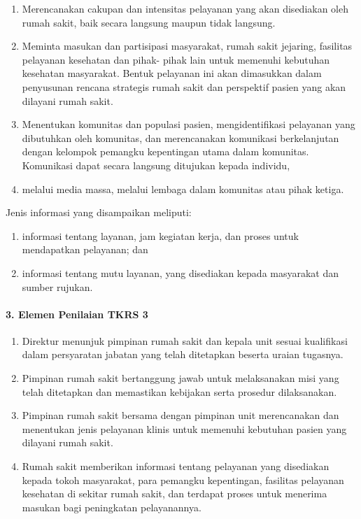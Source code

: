 \documentclass[
]{book}
\providecommand{\tightlist}{%
  \setlength{\itemsep}{0pt}\setlength{\parskip}{0pt}}
\begin{document}
\begin{enumerate}
\def\labelenumi{\alph{enumi}.}
\tightlist
\item
  Merencanakan cakupan dan intensitas pelayanan yang akan disediakan oleh rumah sakit, baik secara langsung maupun tidak langsung.
\item
  Meminta masukan dan partisipasi masyarakat, rumah sakit jejaring, fasilitas pelayanan kesehatan dan pihak- pihak lain untuk memenuhi kebutuhan kesehatan masyarakat. Bentuk pelayanan ini akan dimasukkan dalam penyusunan rencana strategis rumah sakit dan perspektif pasien yang akan dilayani rumah sakit.
\item
  Menentukan komunitas dan populasi pasien, mengidentifikasi pelayanan yang dibutuhkan oleh komunitas, dan merencanakan komunikasi berkelanjutan dengan kelompok pemangku kepentingan utama dalam komunitas. Komunikasi dapat secara langsung ditujukan kepada individu,
\item
  melalui media massa, melalui lembaga dalam komunitas atau pihak ketiga.
\end{enumerate}

Jenis informasi yang disampaikan meliputi:

\begin{enumerate}
\def\labelenumi{\alph{enumi}.}
\tightlist
\item
  informasi tentang layanan, jam kegiatan kerja, dan proses untuk mendapatkan pelayanan; dan
\item
  informasi tentang mutu layanan, yang disediakan kepada masyarakat dan sumber rujukan.
\end{enumerate}

\hypertarget{elemen-penilaian-tkrs-3}{%
\paragraph*{3. Elemen Penilaian TKRS 3}\label{elemen-penilaian-tkrs-3}}

\begin{enumerate}
\def\labelenumi{\alph{enumi}.}
\tightlist
\item
  Direktur menunjuk pimpinan rumah sakit dan kepala unit sesuai kualifikasi dalam persyaratan jabatan yang telah ditetapkan beserta uraian tugasnya.
\item
  Pimpinan rumah sakit bertanggung jawab untuk melaksanakan misi yang telah ditetapkan dan memastikan kebijakan serta prosedur dilaksanakan.
\item
  Pimpinan rumah sakit bersama dengan pimpinan unit merencanakan dan menentukan jenis pelayanan klinis untuk memenuhi kebutuhan pasien yang dilayani rumah sakit.
\item
  Rumah sakit memberikan informasi tentang pelayanan yang disediakan kepada tokoh masyarakat, para pemangku kepentingan, fasilitas pelayanan kesehatan di sekitar rumah sakit, dan terdapat proses untuk menerima masukan bagi peningkatan pelayanannya.
\end{enumerate}
\end{document}
